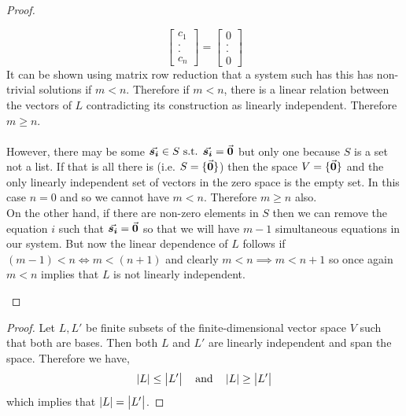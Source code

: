 \documentclass[MathsNotesBase.tex]{subfiles}
\begin{document}
{\begin{proof}
\begin{enumerate}[label=(\roman*)]
{\[					\begin{bmatrix}
					c_1 \\
					. \\
					. \\
					c_n
					\end{bmatrix}
					=
					\begin{bmatrix}
					0 \\
					. \\
					. \\
					0
					\end{bmatrix}
				\]
				It can be shown using matrix row reduction that a system such has this has non-trivial solutions if ${ m < n }$. Therefore if ${ m < n }$, there is a linear relation between the vectors of $L$ contradicting its construction as linearly independent. Therefore ${ m \geq n }$.\\\\
				However, there may be some ${ \vec{\bm{s_i}} \in S \text{ s.t. } \vec{\bm{s_i}} = \vec{\bm{0}} }$ but only one because $S$ is a set not a list. If that is all there is (i.e. ${ S = \{\vec{\bm{0}}\} }$) then the space ${ V = \{\vec{\bm{0}}\} }$ and the only linearly independent set of vectors in the zero space is the empty set. In this case ${ n = 0 }$ and so we cannot have ${ m < n }$. Therefore ${ m \geq n }$ also.\\
				On the other hand, if there are non-zero elements in $S$ then we can remove the equation $i$ such that ${ \vec{\bm{s_i}} = \vec{\bm{0}} }$ so that we will have ${ m - 1 }$ simultaneous equations in our system. But now the linear dependence of $L$ follows if ${ (m-1) < n \iff m < (n+1) }$ and clearly ${ m < n \implies m < n+1 }$ so once again ${ m < n }$ implies that $L$ is not linearly independent. ${ \qedhere }$
			}
		\end{enumerate}
	\end{proof}
	
	\medskip
	\begin{proof}
		Let ${ L,L' }$ be finite subsets of the finite-dimensional vector space $V$ such that both are bases. Then both $L$ and $L'$ are linearly independent and span the space. Therefore we have,
		\[ \left\lvert L\right\rvert \leq \left\lvert L'\right\rvert \hspace{10pt}\text{and}\hspace{10pt} \left\lvert L\right\rvert \geq \left\lvert L'\right\rvert \]
		which implies that ${ \left\lvert L\right\rvert = \left\lvert L'\right\rvert }$.
	\end{proof}
		
}
\end{document}
